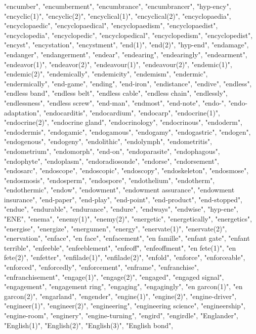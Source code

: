 "encumber",
"encumberment",
"encumbrance",
"encumbrancer",
"hyp-ency",
"encyclic(1)",
"encyclic(2)",
"encyclical(1)",
"encyclical(2)",
"encyclopaedia",
"encyclopaedic",
"encyclopaedical",
"encyclopaedism",
"encyclopaedist",
"encyclopedia",
"encyclopedic",
"encyclopedical",
"encyclopedism",
"encyclopedist",
"encyst",
"encystation",
"encystment",
"end(1)",
"end(2)",
"hyp-end",
"endamage",
"endanger",
"endangerment",
"endear",
"endearing",
"endearingly",
"endearment",
"endeavor(1)",
"endeavor(2)",
"endeavour(1)",
"endeavour(2)",
"endemic(1)",
"endemic(2)",
"endemically",
"endemicity",
"endemism",
"endermic",
"endermically",
"end-game",
"ending",
"end-iron",
"endistance",
"endive",
"endless",
"endless band",
"endless belt",
"endless cable",
"endless chain",
"endlessly",
"endlessness",
"endless screw",
"end-man",
"endmost",
"end-note",
"endo-",
"endo-adaptation",
"endocarditis",
"endocardium",
"endocarp",
"endocrine(1)",
"endocrine(2)",
"endocrine gland",
"endocrinology",
"endocrinous",
"endoderm",
"endodermis",
"endogamic",
"endogamous",
"endogamy",
"endogastric",
"endogen",
"endogenous",
"endogeny",
"endolithic",
"endolymph",
"endometritis",
"endometrium",
"endomorph",
"end-on",
"endoparasite",
"endophagous",
"endophyte",
"endoplasm",
"endoradiosonde",
"endorse",
"endorsement",
"endosarc",
"endoscope",
"endoscopic",
"endoscopy",
"endoskeleton",
"endosmose",
"endosmosis",
"endosperm",
"endospore",
"endothelium",
"endotherm",
"endothermic",
"endow",
"endowment",
"endowment assurance",
"endowment insurance",
"end-paper",
"end-play",
"end-point",
"end-product",
"end-stopped",
"endue",
"endurable",
"endurance",
"endure",
"endways",
"endwise",
"hyp-ene",
"ENE",
"enema",
"enemy(1)",
"enemy(2)",
"energetic",
"energetically",
"energetics",
"energise",
"energize",
"energumen",
"energy",
"enervate(1)",
"enervate(2)",
"enervation",
"enface",
"en face",
"enfacement",
"en famille",
"enfant gate",
"enfant terrible",
"enfeeble",
"enfeeblement",
"enfeoff",
"enfeoffment",
"en fete(1)",
"en fete(2)",
"enfetter",
"enfilade(1)",
"enfilade(2)",
"enfold",
"enforce",
"enforceable",
"enforced",
"enforcedly",
"enforcement",
"enframe",
"enfranchise",
"enfranchisement",
"engage(1)",
"engage(2)",
"engaged",
"engaged signal",
"engagement",
"engagement ring",
"engaging",
"engagingly",
"en garcon(1)",
"en garcon(2)",
"engarland",
"engender",
"engine(1)",
"engine(2)",
"engine-driver",
"engineer(1)",
"engineer(2)",
"engineering",
"engineering science",
"engineership",
"engine-room",
"enginery",
"engine-turning",
"engird",
"engirdle",
"Englander",
"English(1)",
"English(2)",
"English(3)",
"English bond",

